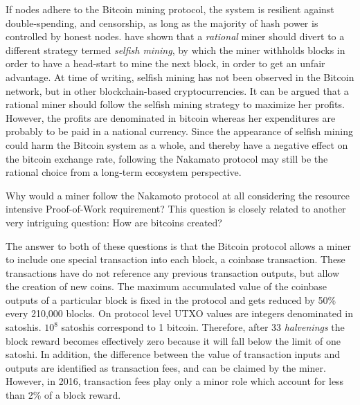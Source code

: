 If nodes adhere to the Bitcoin mining protocol, the system is resilient against double-spending, and censorship, as long as the majority of hash power is controlled by honest nodes. \cite{Eyal2014} have shown that a \emph{rational} miner should divert to a different strategy termed \emph{selfish mining}, by which the miner withholds blocks in order to have a head-start to mine the next block, in order to get an unfair advantage. At time of writing, selfish mining has not been observed in the Bitcoin network, but in other blockchain-based cryptocurrencies. It can be argued that a rational miner should follow the selfish mining strategy to maximize her profits. However, the profits are denominated in bitcoin whereas her expenditures are probably to be paid in a national currency. Since the appearance of selfish mining could harm the Bitcoin system as a whole, and thereby have a negative effect on the bitcoin exchange rate, following the Nakamato protocol may still be the rational choice from a long-term ecosystem perspective. 


Why would a miner follow the Nakamoto protocol at all considering the resource intensive Proof-of-Work requirement? This question is closely related to another very intriguing question: How are bitcoins created?

The answer to both of these questions is that the Bitcoin protocol allows a miner to include one special transaction into each block, a coinbase transaction. These transactions have do not reference any previous transaction outputs, but allow the creation of new coins. The maximum accumulated value of the coinbase outputs of a particular block is fixed in the protocol and gets reduced by 50\% every 210,000 blocks. On protocol level UTXO values are integers denominated in satoshis. $10^8$ satoshis correspond to 1 bitcoin. Therefore, after 33 \emph{halvenings} the block reward becomes effectively zero because it will fall below the limit of one satoshi. In addition, the difference between the value of transaction inputs and outputs are identified as transaction fees, and can be claimed by the miner. However, in 2016, transaction fees play only a minor role which account for less than 2\% of a block reward.

